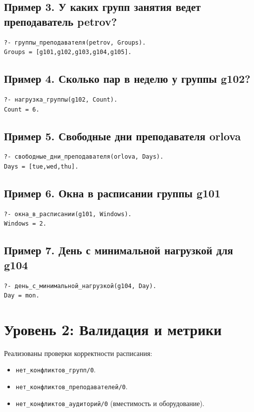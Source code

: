 \documentclass[14pt,a4paper]{extarticle}
\begin{document}
\subsection*{Пример 3. У каких групп занятия ведет преподаватель petrov?}
\begin{verbatim}
?- группы_преподавателя(petrov, Groups).
Groups = [g101,g102,g103,g104,g105].
\end{verbatim}

\subsection*{Пример 4. Сколько пар в неделю у группы g102?}
\begin{verbatim}
?- нагрузка_группы(g102, Count).
Count = 6.
\end{verbatim}

\subsection*{Пример 5. Свободные дни преподавателя orlova}
\begin{verbatim}
?- свободные_дни_преподавателя(orlova, Days).
Days = [tue,wed,thu].
\end{verbatim}

\subsection*{Пример 6. Окна в расписании группы g101}
\begin{verbatim}
?- окна_в_расписании(g101, Windows).
Windows = 2.
\end{verbatim}

\subsection*{Пример 7. День с минимальной нагрузкой для g104}
\begin{verbatim}
?- день_с_минимальной_нагрузкой(g104, Day).
Day = mon.
\end{verbatim}

\section{Уровень 2: Валидация и метрики}
Реализованы проверки корректности расписания:
\begin{itemize}[leftmargin=1.25cm]
  \item \texttt{нет\_конфликтов\_групп/0}.
  \item \texttt{нет\_конфликтов\_преподавателей/0}.
  \item \texttt{нет\_конфликтов\_аудиторий/0} (вместимость и оборудование).
\end{itemize}
\end{document}
